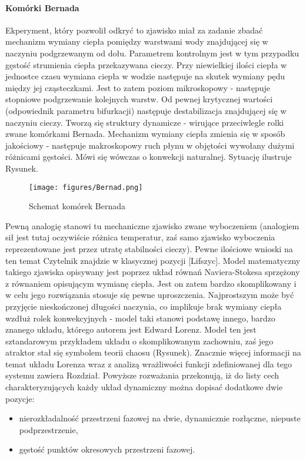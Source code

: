 \documentclass[12pt]{article}
\begin{document}
\paragraph{Komórki Bernada}
Ekperyment, który pozwolił odkryć to zjawisko miał za zadanie zbadać mechanizm wymiany ciepła pomiędzy warstwami wody znajdującej się w naczyniu podgrzewanym od dołu. Parametrem kontrolnym jest w tym przypadku gęstość strumienia ciepła przekazywana cieczy. Przy niewielkiej ilości ciepła w jednostce czasu wymiana ciepła w wodzie następuje na skutek wymiany pędu między jej cząsteczkami. Jest to zatem poziom mikroskopowy - następuje stopniowe podgrzewanie kolejnych warstw. Od pewnej krytycznej wartości (odpowiednik parametru bifurkacji) następuje destabilizacja znajdującej się w naczyniu cieczy. Tworzą się struktury dynamicze - wirujące przeciwlegle rolki zwane komórkami Bernada. Mechanizm wymiany ciepła zmienia się w sposób jakościowy - następuje makroskopowy ruch płynu w objętości wywołany dużymi różnicami gęstości. Mówi się wówczas o konwekcji naturalnej. Sytuację ilustruje Rysunek.
\begin{figure}[H]
	\texttt{[image: figures/Bernad.png]} 
	\centering
	\caption{Schemat komórek Bernada}
\end{figure}
Pewną analogię stanowi tu mechaniczne zjawisko zwane wyboczeniem (analogiem sił jest tutaj oczywiście różnica temperatur, zaś samo zjawisko wyboczenia reprezentowane jest przez utratę stabilności cieczy). Pewne ilościowe wnioski na ten temat Czytelnik znajdzie w klasycznej pozycji [Lifszyc].\newline
Model matematyczny takiego zjawiska opisywany jest poprzez układ równań Naviera-Stokesa sprzężony z równaniem opisującym wymianę ciepła. Jest on zatem bardzo skomplikowany i w celu jego rozwiązania stosuje się pewne uproszczenia. Najprostszym może być przyjęcie nieskończonej długości naczynia, co implikuje brak wymiany ciepła wzdłuż rolek konwekcyjnych - model taki stanowi podstawę innego, bardzo znanego układu, którego autorem jest Edward Lorenz. Model ten jest sztandarowym przykładem układu o skomplikowanym zachowniu, zaś jego atraktor stał się symbolem teorii chaosu (Rysunek). Znacznie więcej informacji na temat układu Lorenza wraz z analizą wrażliwości funkcji zdefiniowanej dla tego systemu zawiera Rozdział.\newline
Powyższe rozważania przekonują, iż do listy cech charakteryzujących każdy układ dynamiczny można dopisać dodatkowe dwie pozycje:
\begin{itemize}
	\item nierozkładalność przestrzeni fazowej na dwie, dynamicznie rozłączne, niepuste podprzestrzenie,
	\item gęstość punktów okresowych przestrzeni fazowej.
\end{itemize}
\end{document}
